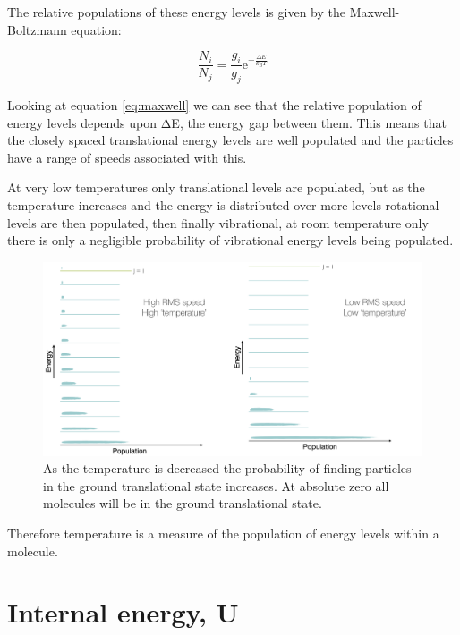\documentclass[
]{book}
\begin{document}
The relative populations of these energy levels is given by the Maxwell-Boltzmann equation:

\begin{equation}
\frac{N_i}{N_j}=\frac{g_i}{g_j} \textrm{e}^{-\frac{\Delta E}{k_B T}}
\label{eq:maxwell}
\end{equation}

Looking at equation \eqref{eq:maxwell} we can see that the relative population of energy levels depends upon ΔE, the energy gap between them. This means that the closely spaced translational energy levels are well populated and the particles have a range of speeds associated with this.

At very low temperatures only translational levels are populated, but as the temperature increases and the energy is distributed over more levels rotational levels are then populated, then finally vibrational, at room temperature only there is only a negligible probability of vibrational energy levels being populated.

\begin{figure}

{\centering \includegraphics[width=0.8\linewidth]{images/approachingzero} 

}

\caption{As the temperature is decreased the probability of finding particles in the ground translational state increases. At absolute zero all molecules will be in the ground translational state. }\label{fig:approachingzero}
\end{figure}

Therefore temperature is a measure of the population of energy levels within a molecule.

\hypertarget{internal-energy-u}{%
\section{Internal energy, U}\label{internal-energy-u}}
\end{document}
